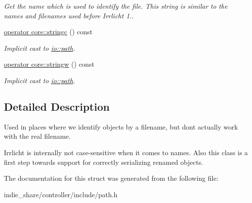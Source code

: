 \begin{DoxyCompactItemize}
\begin{DoxyCompactList}\small\item\em Get the name which is used to identify the file. This string is similar to the names and filenames used before Irrlicht 1.. \end{DoxyCompactList}\item 
\mbox{\label{structirr_1_1io_1_1SNamedPath_a414604db7696d60f759e645beee928c8}} 
\hyperlink{structirr_1_1io_1_1SNamedPath_a414604db7696d60f759e645beee928c8}{operator core\+::stringc} () const
\begin{DoxyCompactList}\small\item\em Implicit cast to \hyperlink{namespaceirr_1_1io_a6468281622ce3a1c46b72e19f32dded5}{io\+::path}. \end{DoxyCompactList}\item 
\mbox{\label{structirr_1_1io_1_1SNamedPath_abe0d6bc5cf1c59bc90ea9d98750a8976}} 
\hyperlink{structirr_1_1io_1_1SNamedPath_abe0d6bc5cf1c59bc90ea9d98750a8976}{operator core\+::stringw} () const
\begin{DoxyCompactList}\small\item\em Implicit cast to \hyperlink{namespaceirr_1_1io_a6468281622ce3a1c46b72e19f32dded5}{io\+::path}. \end{DoxyCompactList}\end{DoxyCompactItemize}


\subsection{Detailed Description}
Used in places where we identify objects by a filename, but don\textquotesingle{}t actually work with the real filename. 

Irrlicht is internally not case-\/sensitive when it comes to names. Also this class is a first step towards support for correctly serializing renamed objects. 

The documentation for this struct was generated from the following file\+:\begin{DoxyCompactItemize}
\item 
indie\+\_\+share/controller/include/path.\+h\end{DoxyCompactItemize}
